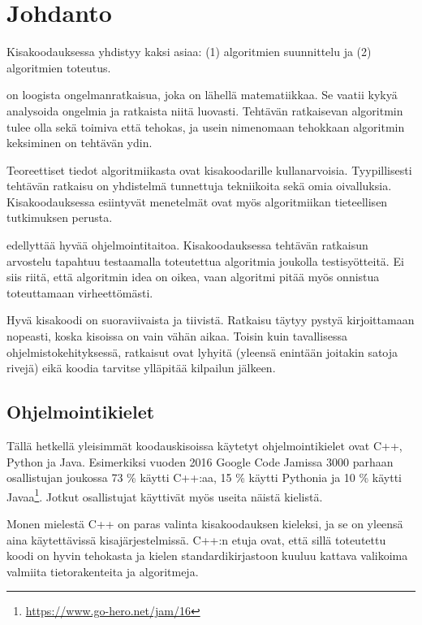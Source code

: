 \chapter{Johdanto}

Kisakoodauksessa yhdistyy kaksi asiaa:
(1) algoritmien suunnittelu ja
(2) algoritmien toteutus.

 on loogista ongelmanratkaisua,
joka on lähellä matematiikkaa.
Se vaatii kykyä analysoida ongelmia ja
ratkaista niitä luovasti.
Tehtävän ratkaisevan algoritmin tulee olla sekä
toimiva että tehokas,
ja usein nimenomaan tehokkaan algoritmin
keksiminen on tehtävän ydin.

Teoreettiset tiedot algoritmiikasta
ovat kisakoodarille kullanarvoisia.
Tyypillisesti tehtävän ratkaisu on yhdistelmä tunnettuja
tekniikoita sekä omia oivalluksia.
Kisakoodauksessa esiintyvät menetelmät ovat myös
algoritmiikan tieteellisen tutkimuksen perusta.

 edellyttää hyvää ohjelmointitaitoa.
Kisakoodauksessa tehtävän ratkaisun arvostelu tapahtuu
testaamalla toteutettua algoritmia
joukolla testisyötteitä.
Ei siis riitä, että algoritmin idea on oikea,
vaan algoritmi pitää myös onnistua toteuttamaan virheettömästi.

Hyvä kisakoodi on suoraviivaista ja tiivistä.
Ratkaisu täytyy pystyä kirjoittamaan nopeasti,
koska kisoissa on vain vähän aikaa.
Toisin kuin tavallisessa ohjelmistokehityksessä,
ratkaisut ovat lyhyitä
(yleensä enintään joitakin satoja rivejä)
eikä koodia tarvitse ylläpitää kilpailun jälkeen.

\section{Ohjelmointikielet}


Tällä hetkellä yleisimmät koodauskisoissa
käytetyt ohjelmointikielet ovat C++, Python ja Java.
Esimerkiksi vuoden 2016 Google Code Jamissa
3000 parhaan osallistujan joukossa
73 \% käytti C++:aa,
15 \% käytti Pythonia ja
10 \% käytti Javaa\footnote{\url{https://www.go-hero.net/jam/16}}.
Jotkut osallistujat käyttivät myös useita näistä kielistä.

Monen mielestä C++ on paras
valinta kisakoodauksen kieleksi,
ja se on yleensä aina käytettävissä
kisajärjestelmissä.
C++:n etuja ovat, että sillä
toteutettu koodi on hyvin tehokasta
ja kielen standardikirjastoon
kuuluu kattava valikoima valmiita
tietorakenteita ja algoritmeja.

